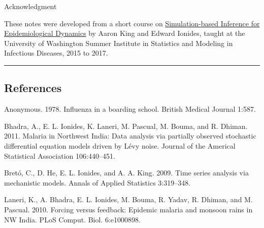 \documentclass[]{article}
\begin{document}
Acknowledgment

These notes were developed from a short course on
\href{http://kingaa.github.io/sbied/}{Simulation-based Inference for
Epidemiological Dynamics} by Aaron King and Edward Ionides, taught at
the University of Washington Summer Institute in Statistics and Modeling
in Infectious Diseases, 2015 to 2017.

\begin{center}\rule{0.5\linewidth}{\linethickness}\end{center}

\subsection*{References}\label{references}

\hypertarget{refs}{}
\hypertarget{ref-anonymous78}{}
Anonymous. 1978. Influenza in a boarding school. British Medical Journal
1:587.

\hypertarget{ref-bhadra11}{}
Bhadra, A., E. L. Ionides, K. Laneri, M. Pascual, M. Bouma, and R.
Dhiman. 2011. Malaria in Northwest India: Data analysis via partially
observed stochastic differential equation models driven by Lévy noise.
Journal of the Americal Statistical Association 106:440--451.

\hypertarget{ref-breto09}{}
Bretó, C., D. He, E. L. Ionides, and A. A. King. 2009. Time series
analysis via mechanistic models. Annals of Applied Statistics
3:319--348.

\hypertarget{ref-laneri10}{}
Laneri, K., A. Bhadra, E. L. Ionides, M. Bouma, R. Yadav, R. Dhiman, and
M. Pascual. 2010. Forcing versus feedback: Epidemic malaria and monsoon
rains in NW India. PLoS Comput. Biol. 6:e1000898.
\end{document}
